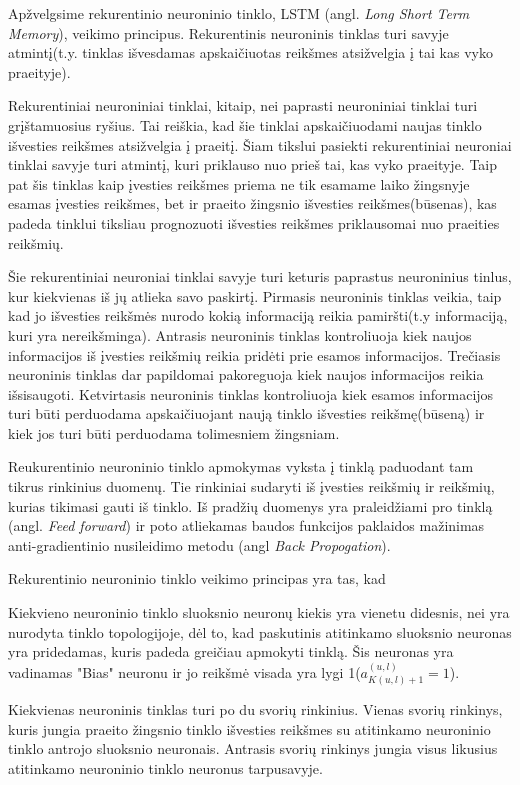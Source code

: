Apžvelgsime rekurentinio neuroninio tinklo, LSTM (angl. \textit{Long Short Term Memory}), veikimo principus.
Rekurentinis neuroninis tinklas turi savyje atmintį(t.y. tinklas išvesdamas apskaičiuotas reikšmes atsižvelgia į tai kas vyko praeityje).

Rekurentiniai neuroniniai tinklai, kitaip, nei paprasti neuroniniai tinklai turi grįštamuosius ryšius. Tai reiškia, kad šie tinklai apskaičiuodami naujas tinklo išvesties reikšmes atsižvelgia į praeitį. Šiam tikslui pasiekti rekurentiniai neuroniai tinklai savyje turi atmintį, kuri priklauso nuo prieš tai, kas vyko praeityje. Taip pat šis tinklas kaip įvesties reikšmes priema ne tik esamame laiko žingsnyje esamas įvesties reikšmes, bet ir praeito žingsnio išvesties reikšmes(būsenas), kas padeda tinklui tiksliau prognozuoti išvesties reikšmes priklausomai nuo praeities reikšmių.

Šie rekurentiniai neuroniai tinklai savyje turi keturis paprastus neuroninius tinlus, kur kiekvienas iš jų atlieka savo paskirtį. Pirmasis neuroninis tinklas veikia, taip kad jo išvesties reikšmės nurodo kokią informaciją reikia pamiršti(t.y informaciją, kuri yra nereikšminga). Antrasis neuroninis tinklas kontroliuoja kiek naujos informacijos iš įvesties reikšmių reikia pridėti prie esamos informacijos. Trečiasis neuroninis tinklas dar papildomai pakoreguoja kiek naujos informacijos reikia išsisaugoti. Ketvirtasis neuroninis tinklas kontroliuoja kiek esamos informacijos turi būti perduodama apskaičiuojant naują tinklo išvesties reikšmę(būseną) ir kiek jos turi būti perduodama tolimesniem žingsniam.

Reukurentinio neuroninio tinklo apmokymas vyksta į tinklą paduodant tam tikrus rinkinius duomenų. Tie rinkiniai sudaryti iš įvesties reikšmių ir reikšmių, kurias tikimasi gauti iš tinklo. Iš pradžių duomenys yra praleidžiami pro tinklą (angl. \textit{Feed forward}) ir poto atliekamas baudos funkcijos paklaidos mažinimas anti-gradientinio nusileidimo metodu (angl \textit{Back Propogation}).

Rekurentinio neuroninio tinklo veikimo principas yra tas, kad


Kiekvieno neuroninio tinklo sluoksnio neuronų kiekis yra vienetu didesnis, nei yra nurodyta tinklo topologijoje, dėl to, kad paskutinis atitinkamo sluoksnio neuronas yra pridedamas, kuris padeda greičiau apmokyti tinklą. Šis neuronas yra vadinamas "Bias" neuronu ir jo reikšmė visada yra lygi 1($a_{K(u,l)+1}^{(u,l)}=1$).

Kiekvienas neuroninis tinklas turi po du svorių rinkinius. Vienas svorių rinkinys, kuris jungia praeito žingsnio tinklo išvesties reikšmes su atitinkamo neuroninio tinklo antrojo sluoksnio neuronais. Antrasis svorių rinkinys jungia visus likusius atitinkamo neuroninio tinklo neuronus tarpusavyje.

